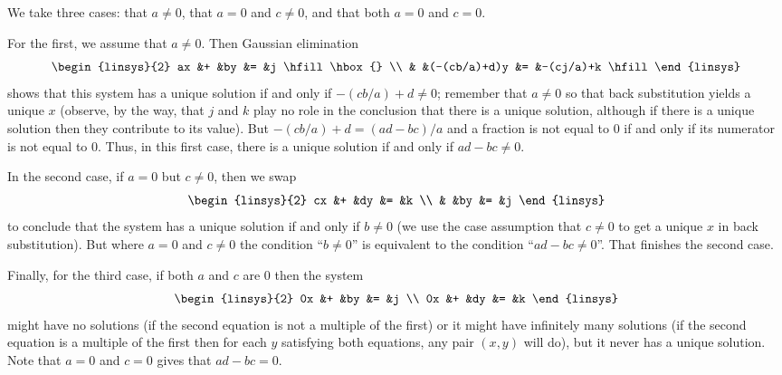 \begin{Answer}
     We take three cases: that $a\neq 0$, that $a=0$ and 
      $c\neq 0$, and that both $a=0$ and $c=0$.

      For the first, we assume that \( a\neq 0 \).
      Then Gaussian elimination
      \begin{equation*}
        \begin{linsys}{2}
          ax  &+  &by                  &=  &j \hfill\hbox{} \\
              &   &(-(cb/a)+d)y  &=  &-(cj/a)+k \hfill  
         \end{linsys}
      \end{equation*}
      shows that this system has a unique solution if and only if
      \( -(cb/a)+d\neq 0   \); remember that \( a\neq 0 \) so 
      that back substitution yields a unique \( x \)
      (observe, by the way, that \( j \) and \( k \) play no role in the
      conclusion that there is a unique solution, although if there is a 
      unique solution then they contribute to its value).
      But \( -(cb/a)+d = (ad-bc)/a \) and a fraction is not equal to \( 0 \) 
      if and only if its numerator is not equal to \( 0 \).
      Thus, in this first case, there is a unique solution if and only if
      $ad-bc\neq 0$.

      In the second case, if \( a=0 \) but \( c\neq 0 \), then we swap
      \begin{equation*}
        \begin{linsys}{2}
          cx  &+  &dy  &=  &k  \\
              &   &by  &=  &j  
        \end{linsys}
      \end{equation*}
      to conclude that the system has a unique solution if and only if 
      \( b\neq 0 \)
      (we use the case assumption that \( c\neq 0 \) to get a unique
      \( x \) in back substitution).
      But where \( a=0 \) and \( c\neq 0 \)
      the condition ``\( b\neq 0 \)''
      is equivalent to the condition ``\( ad-bc\neq 0 \)''.
      That finishes the second case.

      Finally, for the third case,
      if both \( a \) and \( c \) are \( 0 \) then the system
      \begin{equation*}
        \begin{linsys}{2}
          0x  &+  &by  &=  &j  \\
          0x  &+  &dy  &=  &k  
        \end{linsys}
      \end{equation*}
      might have no solutions (if the second equation is not a multiple of the
      first) or it might have infinitely many solutions (if the second
      equation is a multiple of the first then for each \( y \) satisfying
      both equations, any pair \( (x,y) \) will do), but it never has a unique
      solution.
      Note that \( a=0 \) and \( c=0 \) gives that \( ad-bc=0 \). 
\end{Answer}
